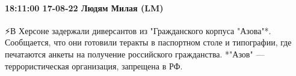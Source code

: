  
 
 
 
 

\paragraph{18:11:00 17-08-22 Людям Милая (LM)}

\obeycr
⚡️В Херсоне задержали диверсантов из "Гражданского корпуса "Азова"*.
Сообщается, что они готовили теракты в паспортном столе и типографии, где печатаются анкеты на получение российского гражданства.
*"Азов" — террористическая организация, запрещена в РФ.
\restorecr
